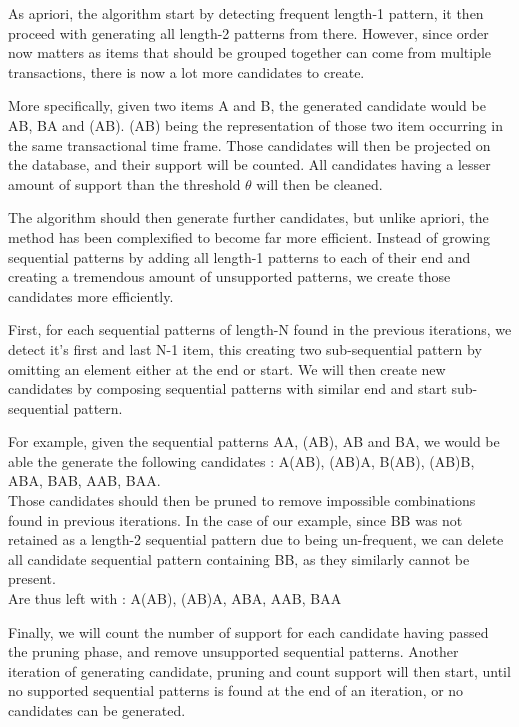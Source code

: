 \documentclass{eplmastersthesis}
\begin{document}
As apriori, the algorithm start by detecting frequent length-1 pattern, it then proceed with generating all length-2 patterns from there. However, since order now matters as items that should be grouped together can come from multiple transactions, there is now a lot more candidates to create. \newline

More specifically, given two items A and B, the generated candidate would be AB, BA and (AB). (AB) being the representation of those two item occurring in the same transactional time frame. Those candidates will then be projected on the database, and their support will be counted. All candidates having a lesser amount of support than the threshold $\theta$ will then be cleaned. \newline

The algorithm should then generate further candidates, but unlike apriori, the method has been complexified to become far more efficient. Instead of growing sequential patterns by adding all length-1 patterns to each of their end and creating a tremendous amount of unsupported patterns, we create those candidates more efficiently. \newline

First, for each sequential patterns of length-N found in the previous iterations, we detect it's first and last N-1 item, this creating two sub-sequential pattern by omitting an element either at the end or start. We will then create new candidates by composing sequential patterns with similar end and start sub-sequential pattern. \newline

For example, given the sequential patterns AA, (AB), AB and BA, we would be able the generate the following candidates : A(AB), (AB)A, B(AB), (AB)B, ABA, BAB, AAB, BAA. \\
Those candidates should then be pruned to remove impossible combinations found in previous iterations. In the case of our example, since BB was not retained as a length-2 sequential pattern due to being un-frequent, we can delete all candidate sequential pattern containing BB, as they similarly cannot be present. \\
Are thus left with : A(AB), (AB)A, ABA, AAB, BAA \newline

Finally, we will count the number of support for each candidate having passed the pruning phase, and remove unsupported sequential patterns. Another iteration of generating candidate, pruning and count support will then start, until no supported sequential patterns is found at the end of an iteration, or no candidates can be generated. \newline
\end{document}
